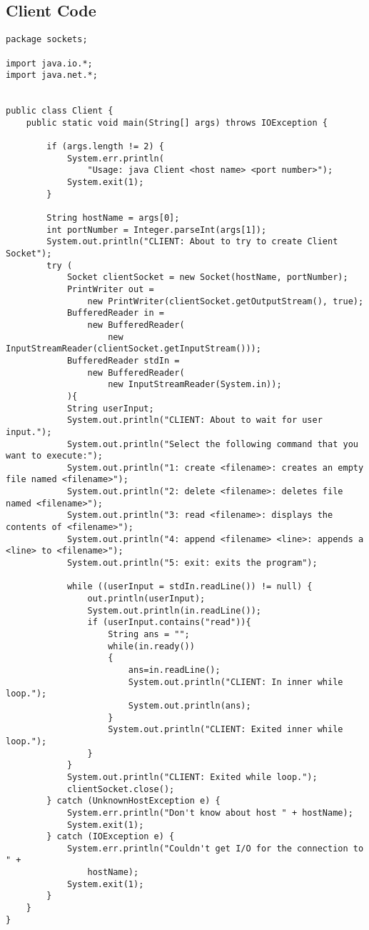 \documentclass{article}
\begin{document}
	\subsection{Client Code}
		\begin{lstlisting}
package sockets;

import java.io.*;
import java.net.*;


public class Client {
	public static void main(String[] args) throws IOException {
        
        if (args.length != 2) {
            System.err.println(
                "Usage: java Client <host name> <port number>");
            System.exit(1);
        }
 
        String hostName = args[0];
        int portNumber = Integer.parseInt(args[1]);
        System.out.println("CLIENT: About to try to create Client Socket");
        try (
            Socket clientSocket = new Socket(hostName, portNumber);
        	PrintWriter out =
                new PrintWriter(clientSocket.getOutputStream(), true);
        	BufferedReader in =
                new BufferedReader(
                    new InputStreamReader(clientSocket.getInputStream()));
            BufferedReader stdIn =
                new BufferedReader(
                    new InputStreamReader(System.in));
        	){
        	String userInput;
        	System.out.println("CLIENT: About to wait for user input.");
        	System.out.println("Select the following command that you want to execute:");
    		System.out.println("1: create <filename>: creates an empty file named <filename>");
    		System.out.println("2: delete <filename>: deletes file named <filename>");
    		System.out.println("3: read <filename>: displays the contents of <filename>");
    		System.out.println("4: append <filename> <line>: appends a <line> to <filename>");
    		System.out.println("5: exit: exits the program");
            
    		while ((userInput = stdIn.readLine()) != null) {
    			out.println(userInput);
    			System.out.println(in.readLine());
    			if (userInput.contains("read")){
    				String ans = "";
    				while(in.ready())
                    {
    					ans=in.readLine();
                    	System.out.println("CLIENT: In inner while loop.");
                    	System.out.println(ans);
                    }
                    System.out.println("CLIENT: Exited inner while loop.");
    			}
    		}
            System.out.println("CLIENT: Exited while loop.");
            clientSocket.close();
        } catch (UnknownHostException e) {
            System.err.println("Don't know about host " + hostName);
            System.exit(1);
        } catch (IOException e) {
            System.err.println("Couldn't get I/O for the connection to " +
                hostName);
            System.exit(1);
        } 
    }
}
		\end{lstlisting}
\end{document}
